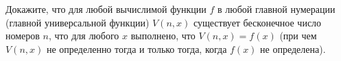 Докажите, что для любой вычислимой функции $f$ в любой главной нумерации (главной универсальной функции)
$V(n, x)$ существует бесконечное число номеров $n$, что для любого $x$ выполнено, что $V(n, x) = f(x)$
(при чем $V(n, x)$ не определенно тогда и только тогда, когда $f(x)$ не определена).
